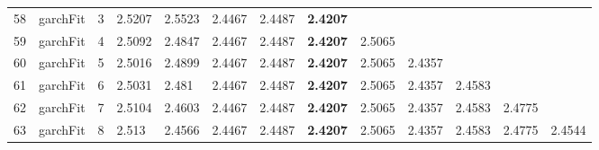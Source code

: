 \documentclass[10pt,a4paper]{article}
\begin{document}
\begin{table}[ht]
\begin{tabular}{rlrllllllllll}
  58 & garchFit &     3 & 2.5207 & 2.5523 & 2.4467 & 2.4487 & \textbf{2.4207} &  &  &  &  &  \\ 
  59 & garchFit &     4 & 2.5092 & 2.4847 & 2.4467 & 2.4487 & \textbf{2.4207} & 2.5065 &  &  &  &  \\ 
  60 & garchFit &     5 & 2.5016 & 2.4899 & 2.4467 & 2.4487 & \textbf{2.4207} & 2.5065 & 2.4357 &  &  &  \\ 
  61 & garchFit &     6 & 2.5031 & 2.481 & 2.4467 & 2.4487 & \textbf{2.4207} & 2.5065 & 2.4357 & 2.4583 &  &  \\ 
  62 & garchFit &     7 & 2.5104 & 2.4603 & 2.4467 & 2.4487 & \textbf{2.4207} & 2.5065 & 2.4357 & 2.4583 & 2.4775 &  \\ 
  63 & garchFit &     8 & 2.513 & 2.4566 & 2.4467 & 2.4487 & \textbf{2.4207} & 2.5065 & 2.4357 & 2.4583 & 2.4775 & 2.4544 \\ 
   \hline
\end{tabular}
\end{table}
\end{document}
